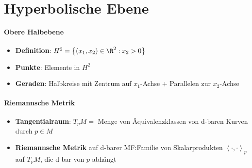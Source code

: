 \section{Hyperbolische Ebene}

\paragraph{Obere Halbebene}
\begin{itemize}
  \item \textbf{Definition}: \( H^2 = \left \{ (x_1,x_2) \in \R^2 : x_2 > 0 \right \} \)
  \item \textbf{Punkte}: Elemente in \( H^2 \)
  \item \textbf{Geraden}: Halbkreise mit Zentrum auf \( x_1 \)-Achse + Parallelen zur \( x_2 \)-Achse
\end{itemize}

\paragraph{Riemannsche Metrik}
\begin{itemize}
  \item \textbf{Tangentialraum}: \( T_p M = \) Menge von Äquivalenzklassen von d-baren Kurven durch \( p \in M \)
  \item \textbf{Riemannsche Metrik} auf d-barer MF:\@ Familie von Skalarprodukten \( \left\langle \cdot, \cdot \right\rangle_p \) auf \( T_p M \), die d-bar von \( p \) abhängt
\end{itemize}


